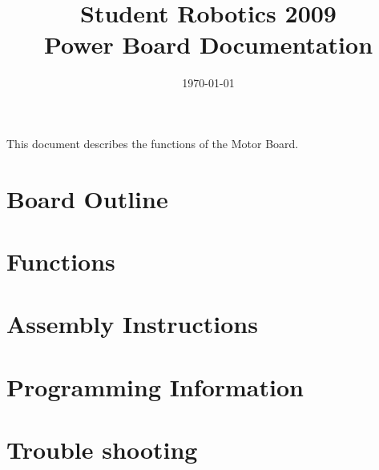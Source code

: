 \documentclass[a4paper, 12pt]{article}
\title {Student Robotics 2009\\ Power Board Documentation}
\date{\today}
\begin{document}
\maketitle

\noindent This document describes the functions of the Motor Board. 

\section{Board Outline}

\section{Functions}

\section{Assembly Instructions}

\section{Programming Information}

\section{Trouble shooting}
\end{document}
